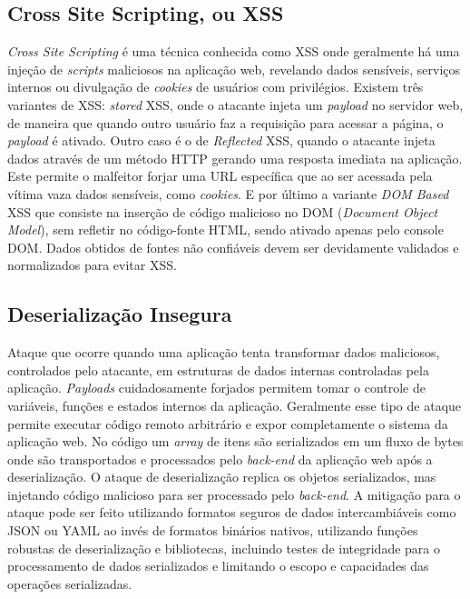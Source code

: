 \subsection{Cross Site Scripting, ou XSS}
\textit{Cross Site Scripting} é uma técnica conhecida como XSS onde geralmente há uma injeção de \textit{scripts} maliciosos na aplicação web, revelando dados sensíveis, serviços internos ou divulgação de \textit{cookies} de usuários com privilégios.
Existem três variantes de XSS: \textit{stored} XSS, onde o atacante injeta um \textit{payload} no servidor web, de maneira que quando outro usuário faz a requisição para acessar a página, o \textit{payload} é ativado. Outro caso é o de \textit{Reflected} XSS, quando o atacante injeta dados através de um método HTTP gerando uma resposta imediata na aplicação. Este permite o malfeitor forjar uma URL específica que ao ser acessada pela vítima vaza dados sensíveis, como \textit{cookies}. E por último a variante \textit{DOM Based} XSS que consiste na inserção de código malicioso no DOM (\textit{Document Object Model}), sem refletir no código-fonte HTML, sendo ativado apenas pelo console DOM.
Dados obtidos de fontes não confiáveis devem ser devidamente validados e normalizados para evitar XSS.

\subsection{Deserialização Insegura}
Ataque que ocorre quando uma aplicação tenta transformar dados maliciosos, controlados pelo atacante, em estruturas de dados internas controladas pela aplicação. \textit{Payloads} cuidadosamente forjados permitem tomar o controle de variáveis, funções e estados internos da aplicação. Geralmente esse tipo de ataque permite executar código remoto arbitrário e expor completamente o sistema da aplicação web.
No código um \textit{array} de itens são serializados em um fluxo de bytes onde são transportados e processados pelo \textit{back-end} da aplicação web após a deserialização.
O ataque de deserialização replica os objetos serializados, mas injetando código malicioso para ser processado pelo \textit{back-end}.
A mitigação para o ataque pode ser feito utilizando formatos seguros de dados intercambiáveis como JSON \cite{json_org} ou YAML \cite{yaml_org} ao invés de formatos binários nativos, utilizando funções robustas de deserialização e bibliotecas, incluindo testes de integridade para o processamento de dados serializados e limitando o escopo e capacidades das operações serializadas.

